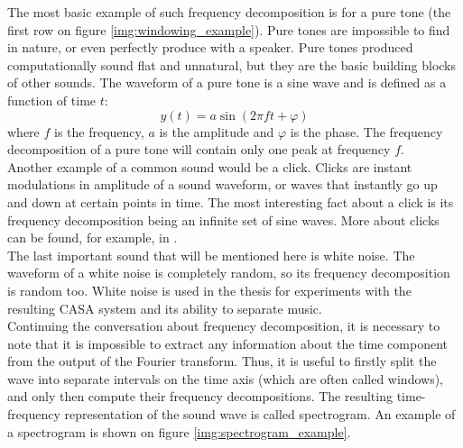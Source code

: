 The most basic example of such frequency decomposition is for a pure tone (the first row on figure \ref{img:windowing_example}). Pure tones are impossible to find in nature, or even perfectly produce with a speaker. Pure tones produced computationally sound flat and unnatural, but they are the basic building blocks of other sounds. The waveform of a pure tone is a sine wave and is defined as a function of time $t$:
\begin{equation}
	y(t) = a\sin(2\pi{}ft + \varphi)
\end{equation}
where $f$ is the frequency, $a$ is the amplitude and $\varphi$ is the phase. The frequency decomposition of a pure tone will contain only one peak at frequency $f$.\\

Another example of a common sound would be a click. Clicks are instant modulations in amplitude of a sound waveform, or waves that instantly go up and down at certain points in time. The most interesting fact about a click is its frequency decomposition being an infinite set of sine waves. More about clicks can be found, for example, in \cite{Schnupp2011}.\\

The last important sound that will be mentioned here is white noise. The waveform of a white noise is completely random, so its frequency decomposition is random too. White noise is used in the thesis for experiments with the resulting CASA system and its ability to separate music.\\

Continuing the conversation about frequency decomposition, it is necessary to note that it is impossible to extract any information about the time component from the output of the Fourier transform. Thus, it is useful to firstly split the wave into separate intervals on the time axis (which are often called windows), and only then compute their frequency decompositions. The resulting time-frequency representation of the sound wave is called spectrogram. An example of a spectrogram is shown on figure \ref{img:spectrogram_example}.

